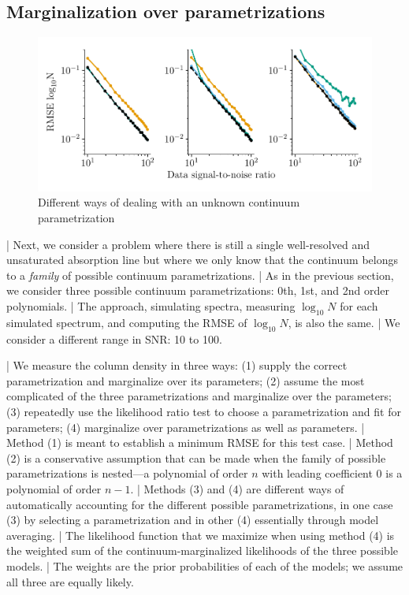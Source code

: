 \documentclass[manuscript]{aastex62}
\begin{document}
\subsection{Marginalization over parametrizations}
\label{sec:marginalization-over-parametrizations}
\begin{figure}
  \includegraphics[width=\linewidth]{figures/order_strategies_labeled.pdf}
  \caption{Different ways of dealing with an unknown continuum parametrization}
  \label{fig:order-unknown-comparison}
\end{figure}
| Next, we consider a problem where there is still a single well-resolved and unsaturated absorption line but where we only know that the continuum belongs to a \emph{family} of possible continuum parametrizations.
| As in the previous section, we consider three possible continuum parametrizations: 0th, 1st, and 2nd order polynomials.
| The approach, simulating spectra, measuring $\log_{10}N$ for each simulated spectrum, and computing the RMSE of $\log_{10}N$, is also the same.
| We consider a different range in SNR: 10 to 100.

| We measure the column density in three ways: (1) supply the correct parametrization and marginalize over its parameters; (2) assume the most complicated of the three parametrizations and marginalize over the parameters; (3) repeatedly use the likelihood ratio test to choose a parametrization and fit for parameters; (4) marginalize over parametrizations as well as parameters.
| Method (1) is meant to establish a minimum RMSE for this test case.
| Method (2) is a conservative assumption that can be made when the family of possible parametrizations is nested---a polynomial of order $n$ with leading coefficient 0 is a polynomial of order $n-1$.
| Methods (3) and (4) are different ways of automatically accounting for the different possible parametrizations, in one case (3) by selecting a parametrization and in other (4) essentially through model averaging.
| The likelihood function that we maximize when using method (4) is the weighted sum of the continuum-marginalized likelihoods of the three possible models.
| The weights are the prior probabilities of each of the models; we assume all three are equally likely.
\end{document}
